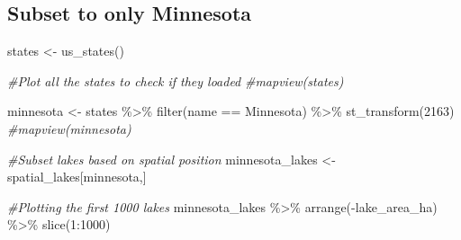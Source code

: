 \documentclass[
]{book}
\newenvironment{Shaded}{\begin{snugshade}}{\end{snugshade}}
\newcommand{\CommentTok}[1]{\textcolor[rgb]{0.56,0.35,0.01}{\textit{#1}}}
\newcommand{\DecValTok}[1]{\textcolor[rgb]{0.00,0.00,0.81}{#1}}
\newcommand{\FunctionTok}[1]{\textcolor[rgb]{0.00,0.00,0.00}{#1}}
\newcommand{\NormalTok}[1]{#1}
\newcommand{\OtherTok}[1]{\textcolor[rgb]{0.56,0.35,0.01}{#1}}
\newcommand{\SpecialCharTok}[1]{\textcolor[rgb]{0.00,0.00,0.00}{#1}}
\newcommand{\StringTok}[1]{\textcolor[rgb]{0.31,0.60,0.02}{#1}}
\begin{document}
\hypertarget{subset-to-only-minnesota}{%
\subsection{Subset to only Minnesota}\label{subset-to-only-minnesota}}

\begin{Shaded}
\begin{Highlighting}[]
\NormalTok{states }\OtherTok{\textless{}{-}} \FunctionTok{us\_states}\NormalTok{()}

\CommentTok{\#Plot all the states to check if they loaded}
\CommentTok{\#mapview(states)}

\NormalTok{minnesota }\OtherTok{\textless{}{-}}\NormalTok{ states }\SpecialCharTok{\%\textgreater{}\%}
  \FunctionTok{filter}\NormalTok{(name }\SpecialCharTok{==} \StringTok{\textquotesingle{}Minnesota\textquotesingle{}}\NormalTok{) }\SpecialCharTok{\%\textgreater{}\%}
  \FunctionTok{st\_transform}\NormalTok{(}\DecValTok{2163}\NormalTok{)}
\CommentTok{\#mapview(minnesota)}

\CommentTok{\#Subset lakes based on spatial position}
\NormalTok{minnesota\_lakes }\OtherTok{\textless{}{-}}\NormalTok{ spatial\_lakes[minnesota,]}

\CommentTok{\#Plotting the first 1000 lakes}
\NormalTok{minnesota\_lakes }\SpecialCharTok{\%\textgreater{}\%}
  \FunctionTok{arrange}\NormalTok{(}\SpecialCharTok{{-}}\NormalTok{lake\_area\_ha) }\SpecialCharTok{\%\textgreater{}\%}
    \FunctionTok{slice}\NormalTok{(}\DecValTok{1}\SpecialCharTok{:}\DecValTok{1000}\NormalTok{)}
\end{Highlighting}
\end{Shaded}
\end{document}
